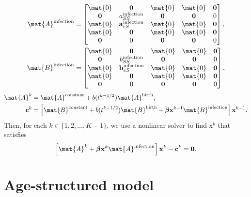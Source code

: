 \documentclass{jpmarticle}
\renewcommand{\vec}[1]{\boldsymbol{\mathrm{#1}}}
\begin{document}
\begin{equation}
  \begin{split}
    \mat{A}^{\text{infection}} &=
    \begin{bmatrix}
      \mat{0} & \vec{0} & \mat{0} & \mat{0} & \vec{0}
      \\
      \vec{0} & a_{SS}^{\text{infection}} & \vec{0} & \vec{0} & 0
      \\
      \mat{0} & \vec{a}_{eS}^{\text{infection}} & \mat{0} & \mat{0} & \vec{0}
      \\
      \mat{0} & \vec{0} & \mat{0} & \mat{0} & \vec{0}
      \\
      \vec{0} & 0 & \vec{0} & \vec{0} & 0
    \end{bmatrix},
    \\
    \mat{B}^{\text{infection}} &=
    \begin{bmatrix}
      \mat{0} & \vec{0} & \mat{0} & \mat{0} & \vec{0}
      \\
      \vec{0} & b_{SS}^{\text{infection}} & \vec{0} & \vec{0} & 0
      \\
      \mat{0} & \vec{b}_{eS}^{\text{infection}} & \mat{0} & \mat{0} & \vec{0}
      \\
      \mat{0} & \vec{0} & \mat{0} & \mat{0} & \vec{0}
      \\
      \vec{0} & 0 & \vec{0} & \vec{0} & 0
    \end{bmatrix},
  \end{split}
\end{equation}
\begin{equation}
  \begin{split}
    \mat{A}^k &=
    \mat{A}^{\text{constant}}
    + b(t^{k - 1 / 2}) \mat{A}^{\text{birth}},
    \\
    \vec{c}^k &=
    \left[
      \mat{B}^{\text{constant}}
      + b(t^{k - 1 / 2}) \mat{B}^{\text{birth}}
      + \vec{\beta} \vec{x}^{k - 1} \mat{B}^{\text{infection}}
    \right] \vec{x}^{k - 1}.
  \end{split}
\end{equation}
Then, for each $k \in \{1, 2, \ldots, K - 1\}$,
we use a nonlinear solver to find $\vec{x}^k$ that satisfies
\begin{equation}
  \left[
    \mat{A}^k
    + \vec{\beta} \vec{x}^k \mat{A}^{\text{infection}}
  \right] \vec{x}^k
  - \vec{c}^k
  = \vec{0}.
\end{equation}


\section{Age-structured model}
\end{document}
